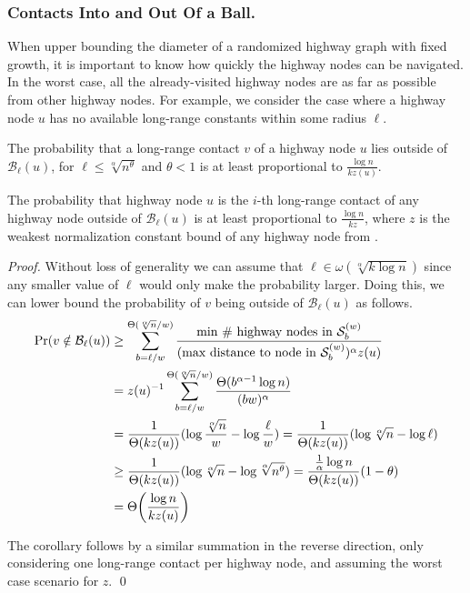 \subsubsection{Contacts Into and Out Of a Ball.}
%
When upper bounding the diameter of a randomized highway graph with fixed
growth, it is important to know how quickly the highway nodes can be navigated.
In the worst case, all the already-visited highway nodes are as far as possible
from other highway nodes.
For example, we consider the case where a highway node $u$ has no available
long-range constants within some radius $\ell$.
%
\begin{lemma} \label{lem:contacts-out}
	The probability that a long-range contact $v$ of a highway node $u$ lies
	outside of $\mathcal{B}_\ell(u)$, for $\ell \leq \sqrt[\alpha]{n^\theta}$
	and $\theta < 1$ is at least proportional to $\frac{\log{n}}{k z(u)}$.
\end{lemma}
%
\begin{corollary} \label{cor:contacts-in}
	The probability that highway node $u$ is the $i$-th long-range contact of
	any highway node outside of $\mathcal{B}_\ell(u)$ is at least proportional
	to $\frac{\log{n}}{k z}$, where $z$ is the weakest normalization constant bound
	of any highway node from .
\end{corollary}

\begin{proof}
	Without loss of generality we can assume that $\ell \in
	\omega(\sqrt[\alpha]{k \log{n}})$ since any smaller value of $\ell$ would
	only make the probability larger.
	Doing this, we can lower bound the probability of $v$ being outside of
	$\mathcal{B}_\ell(u)$ as follows.
	\begin{align*}
		\Pr(v \notin \mathcal{B}_\ell(u)) &\geq \sum_{b = \ell/w}^{\Theta(\sqrt[\alpha]{n}/w)}{\frac{\text{min \# highway nodes in } \mathcal{S}_b^{(w)}}{(\text{max distance to node in } \mathcal{S}_b^{(w)})^\alpha z(u)}} \\
		&= z(u)^{-1} \sum_{b = \ell/w}^{\Theta(\sqrt[\alpha]{n}/w)}{\frac{\Theta(b^{\alpha - 1} \log{n})}{(b w)^\alpha}} \\
		&= \frac{1}{\Theta(k z(u))} (\log{\frac{\sqrt[\alpha]{n}}{w}} - \log{\frac{\ell}{w}}) = \frac{1}{\Theta(k z(u))} (\log{\sqrt[\alpha]{n}} - \log{\ell}) \\
		&\geq \frac{1}{\Theta(k z(u))} (\log{\sqrt[\alpha]{n}} - \log{\sqrt[\alpha]{n^\theta}}) = \frac{\frac{1}{\alpha} \log{n}}{\Theta(k z(u))} (1 - \theta) \\
		&= \Theta\pars*{\frac{\log{n}}{k z(u)}}
	\end{align*}

	The corollary follows by a similar summation in the reverse direction,
	only considering one long-range contact per highway node, and assuming the
	worst case scenario for $z$.
	\qed
\end{proof}
